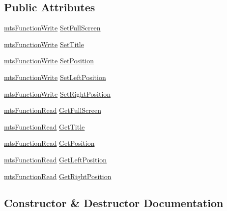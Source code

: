 \subsection*{Public Attributes}
\begin{DoxyCompactItemize}
\item 
\hyperlink{classmts_function_write}{mts\+Function\+Write} \hyperlink{class_i_req_filter_image_window_a64e90d5af4304eb57bc78d2c303225b4}{Set\+Full\+Screen}
\item 
\hyperlink{classmts_function_write}{mts\+Function\+Write} \hyperlink{class_i_req_filter_image_window_a40613d2152c6d25017adf0f724dc04a4}{Set\+Title}
\item 
\hyperlink{classmts_function_write}{mts\+Function\+Write} \hyperlink{class_i_req_filter_image_window_a55437ed8b64ffeb5a155793c49d10425}{Set\+Position}
\item 
\hyperlink{classmts_function_write}{mts\+Function\+Write} \hyperlink{class_i_req_filter_image_window_ac2dc528355ba785828389417e5d0caac}{Set\+Left\+Position}
\item 
\hyperlink{classmts_function_write}{mts\+Function\+Write} \hyperlink{class_i_req_filter_image_window_a7f5e8c1b5bbbf3e1f9ea90836f36b4cf}{Set\+Right\+Position}
\item 
\hyperlink{classmts_function_read}{mts\+Function\+Read} \hyperlink{class_i_req_filter_image_window_ab33c03a38551f95a195b05aadcd104dc}{Get\+Full\+Screen}
\item 
\hyperlink{classmts_function_read}{mts\+Function\+Read} \hyperlink{class_i_req_filter_image_window_a3dc54b8a14bb8d947e0e0daae5aef025}{Get\+Title}
\item 
\hyperlink{classmts_function_read}{mts\+Function\+Read} \hyperlink{class_i_req_filter_image_window_a27d1038d8e50eb558173e5fa60f15354}{Get\+Position}
\item 
\hyperlink{classmts_function_read}{mts\+Function\+Read} \hyperlink{class_i_req_filter_image_window_a5b6bfed6bbba99b634ddf86537bb36de}{Get\+Left\+Position}
\item 
\hyperlink{classmts_function_read}{mts\+Function\+Read} \hyperlink{class_i_req_filter_image_window_a172bda142519b8cbd7b438f0e9620034}{Get\+Right\+Position}
\end{DoxyCompactItemize}


\subsection{Constructor \& Destructor Documentation}
\hypertarget{class_i_req_filter_image_window_a8b35a80a3c595aa512d9854c11dba249}{}
